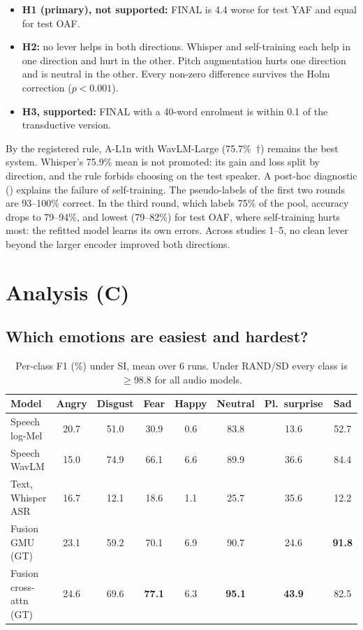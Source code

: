\begin{itemize}\setlength\itemsep{1pt}
\item \textbf{H1 (primary), not supported:} FINAL is 4.4\pp{} worse for test YAF and equal for test OAF.
\item \textbf{H2:} no lever helps in both directions. Whisper and self-training each help in one direction and hurt in the other. Pitch augmentation hurts one direction and is neutral in the other. Every non-zero difference survives the Holm correction ($p<0.001$).
\item \textbf{H3, supported:} FINAL with a 40-word enrolment is within 0.1\pp{} of the transductive version.
\end{itemize}
By the registered rule, A-L1n with WavLM-Large (75.7\%~$\dagger$) remains the best system. Whisper's 75.9\% mean is not promoted: its gain and loss split by direction, and the rule forbids choosing on the test speaker.
A post-hoc diagnostic () explains the failure of self-training. The pseudo-labels of the first two rounds are 93--100\% correct. In the third round, which labels 75\% of the pool, accuracy drops to 79--94\%, and lowest (79--82\%) for test OAF, where self-training hurts most: the refitted model learns its own errors.
Across studies 1--5, no clean lever beyond the larger encoder improved both directions.

\section{Analysis (C)}\label{sec:analysis}
\subsection{Which emotions are easiest and hardest?}\label{sec:easy}
\begin{table}[H]\centering\small
\caption[Per-class F1 on the unseen speaker]{Per-class F1 (\%) under SI, mean over 6 runs. Under RAND/SD every class is $\ge98.8$ for all audio models.}\label{tab:f1}
\begin{tabular}{@{}lccccccc@{}}\toprule
Model & Angry & Disgust & Fear & Happy & Neutral & Pl.\ surprise & Sad\\\midrule
Speech log-Mel & 20.7 & 51.0 & 30.9 & 0.6 & 83.8 & 13.6 & 52.7\\
Speech WavLM & 15.0 & 74.9 & 66.1 & 6.6 & 89.9 & 36.6 & 84.4\\
Text, Whisper ASR & 16.7 & 12.1 & 18.6 & 1.1 & 25.7 & 35.6 & 12.2\\
Fusion GMU (GT) & 23.1 & 59.2 & 70.1 & 6.9 & 90.7 & 24.6 & \textbf{91.8}\\
Fusion cross-attn (GT) & 24.6 & 69.6 & \textbf{77.1} & 6.3 & \textbf{95.1} & \textbf{43.9} & 82.5\\\bottomrule
\end{tabular}\end{table}

